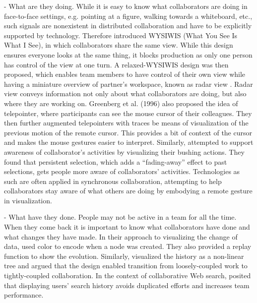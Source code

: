 - What are they doing. While it is easy to know what collaborators are doing in face-to-face settings, e.g. pointing at a figure, walking towards a whiteboard, etc., such signals are nonexistent in distributed collaboration and have to be explicitly supported by technology. Therefore \cite{stefik1987wysiwis} introduced WYSIWIS (What You See Is What I See), in which collaborators share the same view. While this design ensures everyone looks at the same thing, it blocks production as only one person has control of the view at one turn. A relaxed-WYSIWIS design \citep{Gutwin1998h} was then proposed, which enables team members to have control of their own view while having a miniature overview of partner’s workspace, known as radar view \citep{Gutwin1996}. Radar view conveys information not only about what collaborators are doing, but also where they are working on. Greenberg et al. (1996) also proposed the idea of telepointer, where participants can see the mouse cursor of their colleagues. They then further augmented telepointers with traces be means of visualization of the previous motion of the remote cursor. This provides a bit of context of the cursor and makes the mouse gestures easier to interpret. Similarly, \cite{Hajizadeh2013} attempted to support awareness of collaborator’s activities by visualizing their bushing actions. They found that persistent selection, which adds a “fading-away” effect to past selections, gets people more aware of collaborators’ activities. Technologies as such are often applied in synchronous collaboration, attempting to help collaborators stay aware of what others are doing by embodying a remote gesture in visualization.

- What have they done. People may not be active in a team for all the time. When they come back it is important to know what collaborators have done and what changes they have made. In their approach to visualizing the change of data, \cite{Schumann2013a} used color to encode when a node was created. They also provided a replay function to show the evolution. Similarly, \cite{Edwards1997i} visualized the history as a non-linear tree and argued that the design enabled transition from loosely-coupled work to tightly-coupled collaboration. In the context of collaborative Web search, \cite{Paul2010} posited that displaying users’ search history avoids duplicated efforts and increases team performance. 

